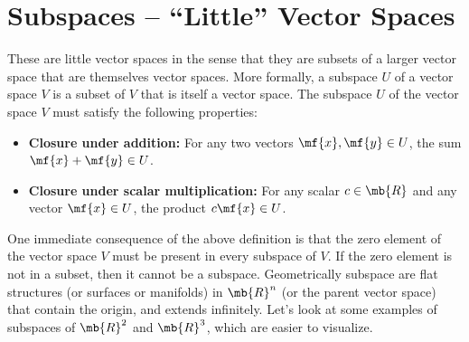 \section{Subspaces -- ``Little'' Vector Spaces}
These are little vector spaces in the sense that they are subsets of a larger vector space that are themselves vector spaces. More formally, a subspace $U$ of a vector space $V$ is a subset of $V$ that is itself a vector space. The subspace $U$ of the vector space $V$ must satisfy the following properties:
\begin{itemize}
    \item \textbf{Closure under addition:} For any two vectors $\mf{x}, \mf{y} \in U$, the sum $\mf{x} + \mf{y} \in U$.
    \item \textbf{Closure under scalar multiplication:} For any scalar $c \in \mb{R}$ and any vector $\mf{x} \in U$, the product $c\mf{x} \in U$.
\end{itemize}
One immediate consequence of the above definition is that the zero element of the vector space $V$ must be present in every subspace of $V$. If the zero element is not in a subset, then it cannot be a subspace. Geometrically subspace are flat structures (or surfaces or manifolds) in $\mb{R}^n$ (or the parent vector space) that contain the origin, and extends infinitely. Let's look at some examples of subspaces of $\mb{R}^2$ and $\mb{R}^3$, which are easier to visualize.

